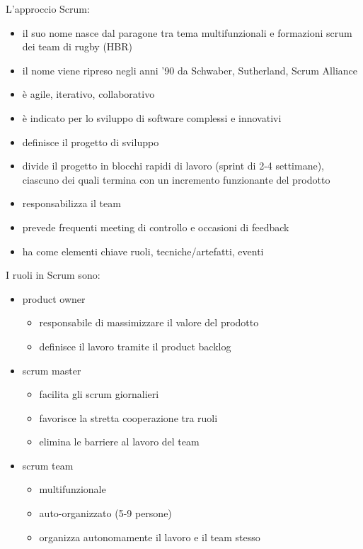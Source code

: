 \documentclass[answers, a4paper, 11pt]{exam}
\begin{document}
L'approccio Scrum:

\begin{itemize}
    \item il suo nome nasce dal paragone tra tema multifunzionali e formazioni scrum dei team di rugby (HBR)
    \item il nome viene ripreso negli anni '90 da Schwaber, Sutherland, Scrum Alliance
    \item è agile, iterativo, collaborativo
    \item è indicato per lo sviluppo di software complessi e innovativi
    \item definisce il progetto di sviluppo
    \item divide il progetto in blocchi rapidi di lavoro (sprint di 2-4 settimane), ciascuno dei quali termina con un incremento funzionante del prodotto
    \item responsabilizza il team
    \item prevede frequenti meeting di controllo e occasioni di feedback
    \item ha come elementi chiave ruoli, tecniche/artefatti, eventi
\end{itemize}

I ruoli in Scrum sono:

\begin{itemize}
    \item product owner
    \begin{itemize}
        \item responsabile di massimizzare il valore del prodotto
        \item definisce il lavoro tramite il product backlog
    \end{itemize}
    \item scrum master
    \begin{itemize}
        \item facilita gli scrum giornalieri
        \item favorisce la stretta cooperazione tra ruoli
        \item elimina le barriere al lavoro del team
    \end{itemize}
    \item scrum team
    \begin{itemize}
        \item multifunzionale
        \item auto-organizzato (5-9 persone)
        \item organizza autonomamente il lavoro e il team stesso
    \end{itemize}
\end{itemize}
\end{document}
